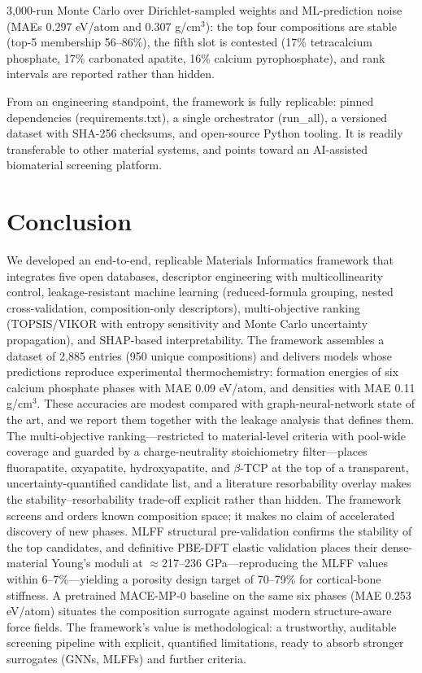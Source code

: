 \documentclass[11pt,a4paper]{article}
\begin{document}
3{,}000-run Monte Carlo over Dirichlet-sampled weights and ML-prediction noise (MAEs 0.297 eV/atom and 0.307 g/cm$^3$): the top four compositions are stable (top-5 membership 56--86\%), the fifth slot is contested (17\% tetracalcium phosphate, 17\% carbonated apatite, 16\% calcium pyrophosphate), and rank intervals are reported rather than hidden.

From an engineering standpoint, the framework is fully replicable: pinned dependencies (requirements.txt), a single orchestrator (run\_all), a versioned dataset with SHA-256 checksums, and open-source Python tooling. It is readily transferable to other material systems, and points toward an AI-assisted biomaterial screening platform.

\section{Conclusion}

We developed an end-to-end, replicable Materials Informatics framework that integrates five open databases, descriptor engineering with multicollinearity control, leakage-resistant machine learning (reduced-formula grouping, nested cross-validation, composition-only descriptors), multi-objective ranking (TOPSIS/VIKOR with entropy sensitivity and Monte Carlo uncertainty propagation), and SHAP-based interpretability. The framework assembles a dataset of 2{,}885 entries (950 unique compositions) and delivers models whose predictions reproduce experimental thermochemistry: formation energies of six calcium phosphate phases with MAE 0.09 eV/atom, and densities with MAE 0.11 g/cm$^3$. These accuracies are modest compared with graph-neural-network state of the art, and we report them together with the leakage analysis that defines them. The multi-objective ranking---restricted to material-level criteria with pool-wide coverage and guarded by a charge-neutrality stoichiometry filter---places fluorapatite, oxyapatite, hydroxyapatite, and $\beta$-TCP at the top of a transparent, uncertainty-quantified candidate list, and a literature resorbability overlay makes the stability--resorbability trade-off explicit rather than hidden. The framework screens and orders known composition space; it makes no claim of accelerated discovery of new phases. MLFF structural pre-validation confirms the stability of the top candidates, and definitive PBE-DFT elastic validation places their dense-material Young's moduli at $\approx$217--236 GPa---reproducing the MLFF values within 6--7\%---yielding a porosity design target of 70--79\% for cortical-bone stiffness. A pretrained MACE-MP-0 baseline on the same six phases (MAE 0.253 eV/atom) situates the composition surrogate against modern structure-aware force fields. The framework's value is methodological: a trustworthy, auditable screening pipeline with explicit, quantified limitations, ready to absorb stronger surrogates (GNNs, MLFFs) and further criteria.
\end{document}
